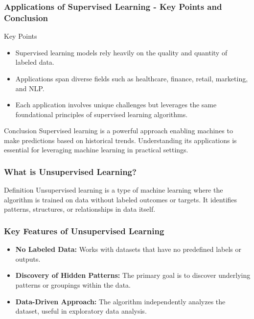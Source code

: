\documentclass{beamer}
\begin{document}
\begin{frame}[fragile]
    \frametitle{Applications of Supervised Learning - Key Points and Conclusion}
    \begin{block}{Key Points}
        \begin{itemize}
            \item Supervised learning models rely heavily on the quality and quantity of labeled data.
            \item Applications span diverse fields such as healthcare, finance, retail, marketing, and NLP.
            \item Each application involves unique challenges but leverages the same foundational principles of supervised learning algorithms.
        \end{itemize}
    \end{block}
    
    \begin{block}{Conclusion}
        Supervised learning is a powerful approach enabling machines to make predictions based on historical trends. Understanding its applications is essential for leveraging machine learning in practical settings.
    \end{block}
\end{frame}

\begin{frame}[fragile]
    \frametitle{What is Unsupervised Learning?}
    \begin{block}{Definition}
        Unsupervised learning is a type of machine learning where the algorithm is trained on data without labeled outcomes or targets. It identifies patterns, structures, or relationships in data itself.
    \end{block}
\end{frame}

\begin{frame}[fragile]
    \frametitle{Key Features of Unsupervised Learning}
    \begin{itemize}
        \item \textbf{No Labeled Data:} Works with datasets that have no predefined labels or outputs.
        \item \textbf{Discovery of Hidden Patterns:} The primary goal is to discover underlying patterns or groupings within the data.
        \item \textbf{Data-Driven Approach:} The algorithm independently analyzes the dataset, useful in exploratory data analysis.
    \end{itemize}
\end{frame}
\end{document}
